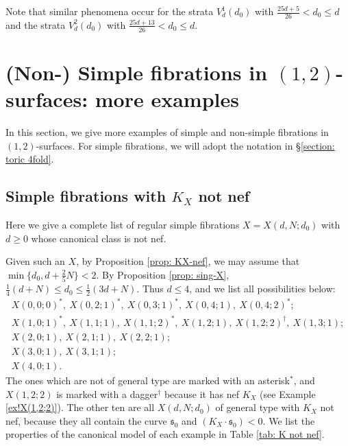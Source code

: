 \documentclass[a4paper,11pt]{amsart}
\newcommand{\s}{\ensuremath{\mathfrak{s}}}
\theoremstyle{definition}
\theoremstyle{remark}
\numberwithin{equation}{section}
\begin{document}
Note that similar phenomena occur for the strata $V_d^1(d_0)$ with $\frac{25d + 5}{26}< d_0 \le d$ and the strata $V_d^2(d_0)$ with $\frac{25d + 13}{26}< d_0 \le d$.

\section{(Non-) Simple fibrations in \texorpdfstring{$(1,2)$}{(1, 2)}-surfaces: more examples} \label{section: example}

In this section, we give more examples of simple and non-simple fibrations in $(1,2)$-surfaces. For simple fibrations, we will adopt the notation in \S \ref{section: toric 4fold}.

\subsection{Simple fibrations with $K_X$ not nef} \label{subsection: K non-nef}
Here we give a complete list of regular simple fibrations $X = X(d, N; d_0)$ with $d \ge 0$ whose canonical class is not nef. 

Given such an $X$, by Proposition \ref{prop: KX-nef}, we may assume that $\min\{d_0,d+\frac25N\} < 2$. By Proposition \ref{prop: sing-X}, $\frac{1}{4}(d + N) \le d_0 \le \frac{1}{2}(3d + N)$. Thus $d \le 4$, and we list all possibilities below:
\begin{gather*}
    X(0,0;0)^*,\ X(0,2;1)^*,\ X(0,3;1)^*,\ X(0,4;1),\ X(0,4;2)^*; \\
    X(1,0;1)^*,\ X(1,1;1),\ X(1,1;2)^*,\ X(1,2;1),\ X(1,2;2)^\dagger,\ X(1,3;1); \\
    X(2,0;1),\ X(2,1;1),\ X(2,2;1); \\
    X(3,0;1),\ X(3,1;1); \\
    X(4,0;1).
\end{gather*}
The ones which are not of general type are marked with an asterisk$^*$, and $X(1,2;2)$ is marked with a dagger$^\dagger$ because it has nef $K_X$ (see Example \ref{ex!X(1,2;2)}). The other ten are all $X(d,N;d_0)$ of general type with $K_X$ not nef, because they all contain the curve $\s_0$ and $(K_X \cdot \s_0) < 0$. We list the properties of the canonical model of each example in Table \ref{tab: K not nef}.
\end{document}
